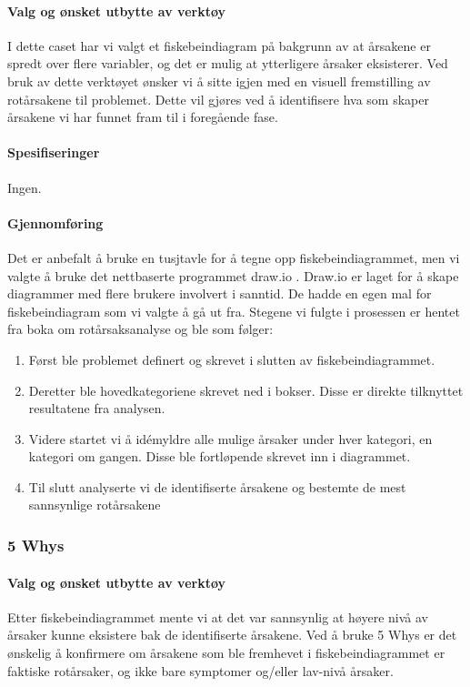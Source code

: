 \paragraph{Valg og ønsket utbytte av verktøy}
I dette caset har vi valgt et fiskebeindiagram på bakgrunn av at årsakene er spredt over flere variabler, og det er mulig at ytterligere årsaker eksisterer. Ved bruk av dette verktøyet ønsker vi å sitte igjen med en visuell fremstilling av rotårsakene til problemet. Dette vil gjøres ved å identifisere hva som skaper årsakene vi har funnet fram til i foregående fase. 

\paragraph{Spesifiseringer}
Ingen.

\paragraph{Gjennomføring}
Det er anbefalt å bruke en tusjtavle for å tegne opp fiskebeindiagrammet, men vi valgte å bruke det nettbaserte programmet draw.io \cite{drawio}. Draw.io er laget for å skape diagrammer med flere brukere involvert i sanntid. De hadde en egen mal for fiskebeindiagram som vi valgte å gå ut fra. Stegene vi fulgte i prosessen er hentet fra boka om rotårsaksanalyse \cite{RCA} og ble som følger:

\begin{enumerate}
    \item Først ble problemet definert og skrevet i slutten av fiskebeindiagrammet.
    \item Deretter ble hovedkategoriene skrevet ned i bokser. Disse er direkte tilknyttet resultatene fra analysen.
    \item Videre startet vi å idémyldre alle mulige årsaker under hver kategori, en kategori om gangen. Disse ble fortløpende skrevet inn i diagrammet.
    \item Til slutt analyserte vi de identifiserte årsakene og bestemte de mest sannsynlige rotårsakene
\end{enumerate}


\subsubsection{5 Whys}

\paragraph{Valg og ønsket utbytte av verktøy}
Etter fiskebeindiagrammet mente vi at det var sannsynlig at høyere nivå av årsaker kunne eksistere bak de identifiserte årsakene. Ved å bruke 5 Whys er det ønskelig å konfirmere om årsakene som ble fremhevet i fiskebeindiagrammet er faktiske rotårsaker, og ikke bare symptomer og/eller lav-nivå årsaker. 

